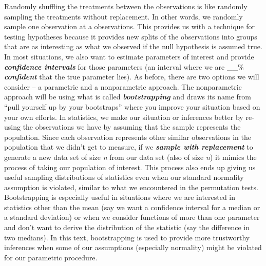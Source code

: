 \documentclass[]{book}
\begin{document}
Randomly shuffling the treatments between the observations is like
randomly sampling the treatments without replacement. In other words, we
randomly sample one observation at a observations. This provides us with
a technique for testing hypotheses because it provides new splits of the
observations into groups that are as interesting as what we observed if
the null hypothesis is assumed true. In most situations, we also want to
estimate parameters of interest and provide \textbf{\emph{confidence
intervals}} for those parameters (an interval where we are \_\_\%
\textbf{\emph{confident}} that the true parameter lies). As before,
there are two options we will consider -- a parametric and a
nonparametric approach. The nonparametric approach will be using what is
called \textbf{\emph{bootstrapping}} and draws its name from ``pull
yourself up by your bootstraps'' where you improve your situation based
on your own efforts. In statistics, we make our situation or inferences
better by re-using the observations we have by assuming that the sample
represents the population. Since each observation represents other
similar observations in the population that we didn't get to measure, if
we \textbf{\emph{sample with replacement}} to generate a new data set of
size \emph{n} from our data set (also of size \emph{n}) it mimics the
process of taking our population of interest. This process also ends up
giving us useful sampling distributions of statistics even when our
standard normality assumption is violated, similar to what we
encountered in the permutation tests. Bootstrapping is especially useful
in situations where we are interested in statistics other than the mean
(say we want a confidence interval for a median or a standard deviation)
or when we consider functions of more than one parameter and don't want
to derive the distribution of the statistic (say the difference in two
medians). In this text, bootstrapping is used to provide more
trustworthy inferences when some of our assumptions (especially
normality) might be violated for our parametric procedure.
\end{document}
